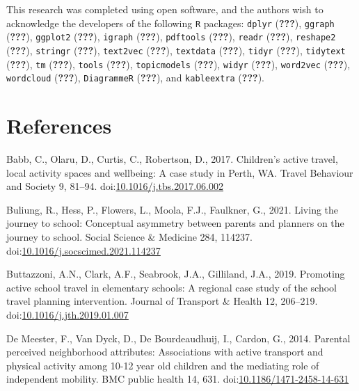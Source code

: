 \documentclass[]{elsarticle} %
\begin{document}
This research was completed using open software, and the authors wish to
acknowledge the developers of the following \texttt{R} packages:
\texttt{dplyr} ({\textbf{???}}), \texttt{ggraph} ({\textbf{???}}),
\texttt{ggplot2} ({\textbf{???}}), \texttt{igraph} ({\textbf{???}}),
\texttt{pdftools} ({\textbf{???}}), \texttt{readr} ({\textbf{???}}),
\texttt{reshape2} ({\textbf{???}}), \texttt{stringr} ({\textbf{???}}),
\texttt{text2vec} ({\textbf{???}}), \texttt{textdata} ({\textbf{???}}),
\texttt{tidyr} ({\textbf{???}}), \texttt{tidytext} ({\textbf{???}}),
\texttt{tm} ({\textbf{???}}), \texttt{tools} ({\textbf{???}}),
\texttt{topicmodels} ({\textbf{???}}), \texttt{widyr} ({\textbf{???}}),
\texttt{word2vec} ({\textbf{???}}), \texttt{wordcloud} ({\textbf{???}}),
\texttt{DiagrammeR} ({\textbf{???}}), and \texttt{kableextra}
({\textbf{???}}).

\hypertarget{references}{%
\section*{References}\label{references}}

\hypertarget{refs}{}
\leavevmode\hypertarget{ref-babbChildrenActiveTravel2017}{}%
Babb, C., Olaru, D., Curtis, C., Robertson, D., 2017. Children's active
travel, local activity spaces and wellbeing: A case study in Perth, WA.
Travel Behaviour and Society 9, 81--94.
doi:\href{https://doi.org/10.1016/j.tbs.2017.06.002}{10.1016/j.tbs.2017.06.002}

\leavevmode\hypertarget{ref-buliungLivingJourneySchool2021}{}%
Buliung, R., Hess, P., Flowers, L., Moola, F.J., Faulkner, G., 2021.
Living the journey to school: Conceptual asymmetry between parents and
planners on the journey to school. Social Science \& Medicine 284,
114237.
doi:\href{https://doi.org/10.1016/j.socscimed.2021.114237}{10.1016/j.socscimed.2021.114237}

\leavevmode\hypertarget{ref-buttazzoniPromotingActiveSchool2019}{}%
Buttazzoni, A.N., Clark, A.F., Seabrook, J.A., Gilliland, J.A., 2019.
Promoting active school travel in elementary schools: A regional case
study of the school travel planning intervention. Journal of Transport
\& Health 12, 206--219.
doi:\href{https://doi.org/10.1016/j.jth.2019.01.007}{10.1016/j.jth.2019.01.007}

\leavevmode\hypertarget{ref-demeesterParentalPerceivedNeighborhood2014}{}%
De Meester, F., Van Dyck, D., De Bourdeaudhuij, I., Cardon, G., 2014.
Parental perceived neighborhood attributes: Associations with active
transport and physical activity among 10-12 year old children and the
mediating role of independent mobility. BMC public health 14, 631.
doi:\href{https://doi.org/10.1186/1471-2458-14-631}{10.1186/1471-2458-14-631}
\end{document}
